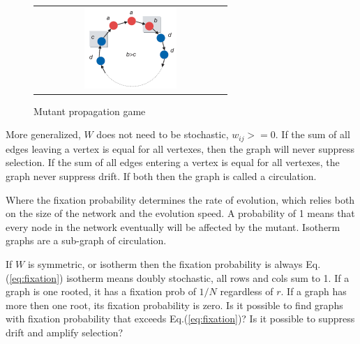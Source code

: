 \begin{figure}[h]
\centering
\begin{tabular}{@{}c@{}}
\includegraphics[width=0.5\textwidth]{natureGameSingle.png}
\end{tabular}
\caption{\label{fig:game} Mutant propagation game}
\end{figure}

More generalized, $W$ does not need to be stochastic, $w_{ij}>=0$. 
If the sum of all edges leaving a vertex is equal for all vertexes, then the graph will never suppress selection.
If the sum of all edges entering a vertex is equal for all vertexes, the graph never suppress drift.
If both then the graph is called a circulation.
     

Where the fixation probability determines the rate of evolution, which relies both on the size of the network and the evolution speed. A probability of 1 means that every node in the network eventually will be affected by the mutant.   
Isotherm graphs are a sub-graph of circulation. 

If $W$ is symmetric, or isotherm then the fixation probability is always Eq.(\ref{eq:fixation})
isotherm means doubly stochastic, all rows and cols sum to 1. 
If a graph is one rooted, it has a fixation prob of $1/N$ regardless of $r$. If a graph has more then one root, its fixation probability is zero. 
Is it possible to find graphs with fixation probability that exceeds Eq.(\ref{eq:fixation})? Is it possible to suppress drift and amplify selection?

